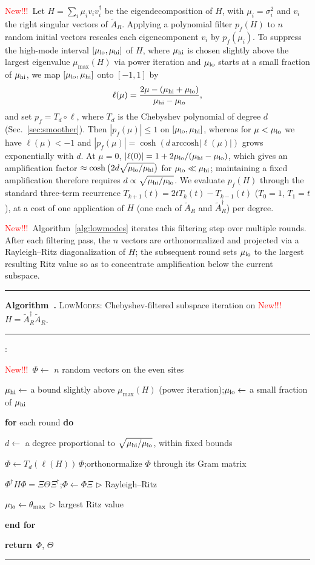 \documentclass[11pt,a4paper]{article}
\newcounter{alg}
\newenvironment{algorithm}[1][]{%
  \par\medskip\noindent\begin{minipage}{\linewidth}\hrule\vspace{3pt}%
  \renewcommand{\caption}[1]{\refstepcounter{alg}\textbf{Algorithm~\thealg.} ##1\par\vspace{3pt}\hrule\vspace{2pt}}}%
  {\vspace{2pt}\hrule\end{minipage}\par\medskip}
\newenvironment{algorithmic}{%
  \begin{list}{\small\arabic{enumi}:}{\usecounter{enumi}\setlength{\topsep}{2pt}\setlength{\itemsep}{1pt}%
  \setlength{\leftmargin}{2.2em}\setlength{\labelwidth}{1.6em}}}{\end{list}}
\newcommand{\State}{\item}
\newcommand{\For}[1]{\item \textbf{for} #1 \textbf{do}}
\newcommand{\EndFor}{\item \textbf{end for}}
\newcommand{\Comment}[1]{\hfill{\small$\triangleright$ #1}}
\newcommand{\Return}{\textbf{return}\ }
\newif\ifshownew \shownewtrue
\DeclareRobustCommand\New{\ifshownew\textcolor{red}{New!!!}\ \else\ignorespaces\fi}
\numberwithin{equation}{section}
\newcommand{\dg}{^{\dagger}}
\newcommand{\AR}{\tilde A_{R}}
\begin{document}
\New Let $H=\sum_i\mu_iv_iv_i\dg$ be the eigendecomposition of $H$, with
$\mu_i=\sigma_i^2$ and $v_i$ the right singular vectors of $\AR$. Applying a polynomial filter
$p_f(H)$ to $n$ random initial vectors rescales each eigencomponent $v_i$ by $p_f(\mu_i)$. To
suppress the high-mode interval $[\mu_{\rm lo},\mu_{\rm hi}]$ of $H$, where $\mu_{\rm hi}$ is
chosen slightly above the largest eigenvalue $\mu_{\max}(H)$ via power iteration and $\mu_{\rm lo}$
starts at a small fraction of $\mu_{\rm hi}$, we map $[\mu_{\rm lo},\mu_{\rm hi}]$ onto $[-1,1]$ by
\begin{equation*}
\ell(\mu)=\frac{2\mu-(\mu_{\rm hi}+\mu_{\rm lo})}{\mu_{\rm hi}-\mu_{\rm lo}},
\end{equation*}
and set $p_f=T_d\circ\ell$, where $T_d$ is the Chebyshev polynomial of degree $d$ (Sec.~\ref{sec:smoother}). Then
$|p_f(\mu)|\le1$ on $[\mu_{\rm lo},\mu_{\rm hi}]$, whereas for $\mu<\mu_{\rm lo}$
we have $\ell(\mu)<-1$ and $|p_f(\mu)|=\cosh(d\,\mathrm{arccosh}|\ell(\mu)|)$ grows
exponentially with $d$. At $\mu=0$,
$|\ell(0)|=1+2\mu_{\rm lo}/(\mu_{\rm hi}-\mu_{\rm lo})$, which gives an amplification
factor $\approx\cosh\big(2d\sqrt{\mu_{\rm lo}/\mu_{\rm hi}}\big)$ for
$\mu_{\rm lo}\ll\mu_{\rm hi}$; maintaining a fixed amplification therefore requires
$d\propto\sqrt{\mu_{\rm hi}/\mu_{\rm lo}}$. We evaluate $p_f(H)$ through the standard
three-term recurrence $T_{k+1}(t)=2tT_k(t)-T_{k-1}(t)$ ($T_0=1$, $T_1=t$), at a cost of one
application of $H$ (one each of $\AR$ and $\AR\dg$) per degree.

\New Algorithm~\ref{alg:lowmodes} iterates this filtering step over multiple
rounds. After each filtering pass, the $n$ vectors are orthonormalized and projected via a
Rayleigh--Ritz diagonalization of $H$; the subsequent round sets $\mu_{\rm lo}$ to the
largest resulting Ritz value so as to concentrate amplification below the current subspace.

\begin{algorithm}
\caption{\textsc{LowModes}: Chebyshev-filtered subspace iteration on \New $H=\AR\dg\AR$.}
\label{alg:lowmodes}
\begin{algorithmic}
\State \New $\Phi\gets$ $n$ random vectors on the even sites
\State $\mu_{\rm hi}\gets$ a bound slightly above $\mu_{\max}(H)$ (power iteration);\quad $\mu_{\rm lo}\gets$ a small fraction of $\mu_{\rm hi}$
\For{each round}
  \State $d\gets$ a degree proportional to $\sqrt{\mu_{\rm hi}/\mu_{\rm lo}}$, within fixed bounds
  \State $\Phi\gets T_d(\ell(H))\,\Phi$;\quad orthonormalize $\Phi$ through its Gram matrix
  \State $\Phi\dg H\Phi=\Xi\Theta\Xi\dg$;\quad $\Phi\gets\Phi\Xi$ \Comment{Rayleigh--Ritz}
  \State $\mu_{\rm lo}\gets\theta_{\max}$ \Comment{largest Ritz value}
\EndFor
\State \Return $\Phi$, $\Theta$
\end{algorithmic}
\end{algorithm}
\end{document}
